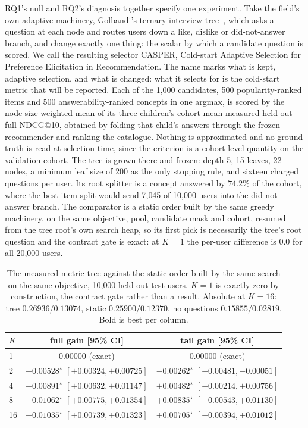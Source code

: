 \documentclass[runningheads]{llncs}
\begin{document}
RQ1's null and RQ2's diagnosis together specify one experiment. Take the field's own adaptive
machinery, Golbandi's ternary interview tree~\cite{golbandi2011adaptive}, which asks a question at
each node and routes users down a like, dislike or did-not-answer branch, and change exactly one
thing: the scalar by which a candidate question is scored. We call the resulting selector CASPER,
Cold-start Adaptive Selection for Preference Elicitation in Recommendation. The name marks what is kept, adaptive
selection, and what is changed: what it selects for is the cold-start metric that will be reported. Each of the 1{,}000 candidates, 500
popularity-ranked items and 500 answerability-ranked concepts in one argmax, is scored by the
node-size-weighted mean of its three children's cohort-mean measured held-out full NDCG@10, obtained
by folding that child's answers through the frozen recommender and ranking the catalogue. Nothing is
approximated and no ground truth is read at selection time, since the criterion is a cohort-level
quantity on the validation cohort. The tree is grown there and frozen: depth 5, 15 leaves, 22 nodes,
a minimum leaf size of 200 as the only stopping rule, and sixteen charged questions per user. Its root
splitter is a concept answered by $74.2\%$ of the cohort, where the best item split would send 7{,}045
of 10{,}000 users into the did-not-answer branch. The comparator is a static order built by the same
greedy machinery, on the same objective, pool, candidate mask and cohort, resumed from the tree
root's own search heap, so its first pick is necessarily the tree's root question and the contract
gate is exact: at $K{=}1$ the per-user difference is $0.0$ for all 20{,}000 users.

\begin{table}[tbp]
\centering
\caption{The measured-metric tree against the static order built by the same search on the same
objective, 10{,}000 held-out test users. $K{=}1$ is exactly zero by construction, the contract gate
rather than a result. Absolute at $K{=}16$: tree $0.26936/0.13074$, static $0.25900/0.12370$, no
questions $0.15855/0.02819$. Bold is best per column.}
\label{tab:tree}
\small
\begin{tabular}{lcc}
\toprule
$K$ & full gain [95\% CI] & tail gain [95\% CI] \\
\midrule
1 & $0.00000$ (exact) & $0.00000$ (exact) \\
2 & $+0.00528^\star$ $[+0.00324,+0.00725]$ & $-0.00262^\star$ $[-0.00481,-0.00051]$ \\
4 & $+0.00891^\star$ $[+0.00632,+0.01147]$ & $+0.00482^\star$ $[+0.00214,+0.00756]$ \\
8 & $\mathbf{+0.01062}^\star$ $[+0.00775,+0.01354]$ & $\mathbf{+0.00835}^\star$ $[+0.00543,+0.01130]$ \\
16 & $+0.01035^\star$ $[+0.00739,+0.01323]$ & $+0.00705^\star$ $[+0.00394,+0.01012]$ \\
\bottomrule
\end{tabular}
\end{table}
\end{document}
